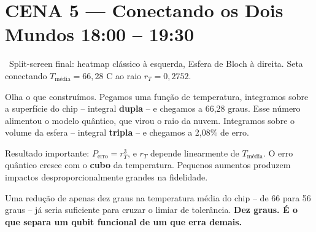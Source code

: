 \section{CENA 5 --- Conectando os Dois Mundos \hfill \normalfont\small\color{corTempo}18:00 -- 19:30}


\begin{visual}
\faFilm\ Split-screen final: heatmap clássico à esquerda, Esfera de Bloch à direita.
Seta conectando $T_{\text{média}} = 66{,}28$ {\textdegree}C ao raio $r_T = 0{,}2752$.
\end{visual}

\begin{fala}
Olha o que construímos. Pegamos uma função de temperatura, integramos sobre
a superfície do chip -- integral \textbf{dupla} -- e chegamos a 66,28 graus.
Esse número alimentou o modelo quântico, que virou o raio da nuvem.
Integramos sobre o volume da esfera -- integral \textbf{tripla} --
e chegamos a 2,08\% de erro.
\end{fala}

\begin{fala}
Resultado importante: $P_{\text{erro}} = r_T^3$, e $r_T$ depende linearmente
de $T_{\text{média}}$. O erro quântico cresce com o \textbf{cubo} da temperatura.
Pequenos aumentos produzem impactos desproporcionalmente grandes na fidelidade.
\end{fala}


\begin{center}
\end{center}

\begin{fala}
Uma redução de apenas dez graus na temperatura média do chip --
de 66 para 56 graus -- já seria suficiente para cruzar o limiar de tolerância.
\textbf{Dez graus. É o que separa um qubit funcional de um que erra demais.}
\end{fala}